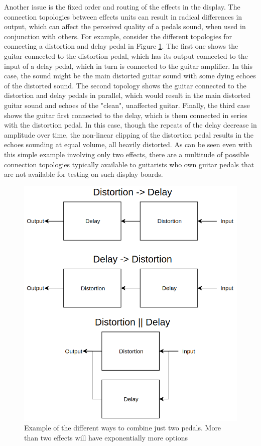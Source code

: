 \documentclass{article}
\begin{document}
	Another issue is the fixed order and routing of the effects in the display.  The connection topologies between effects units can result in radical differences in output, which can affect the perceived quality of a pedals sound, when used in conjunction with others.  For example, consider the different topologies for connecting a distortion and delay pedal in Figure \ref{fig:PedalConnectionTopologies}.  The first one shows the guitar connected to the distortion pedal, which has its output connected to the input of a delay pedal, which in turn is connected to the guitar amplifier.  In this case, the sound might be the main distorted guitar sound with some dying echoes of the distorted sound.  The second topology shows the guitar connected to the distortion and delay pedals in parallel, which would result in the main distorted guitar sound and echoes of the "clean", unaffected guitar.  Finally, the third case shows the guitar first connected to the delay, which is them connected in series with the distortion pedal.  In this case, though the repeats of the delay decrease in amplitude over time, the non-linear clipping of the distortion pedal results in the echoes sounding at equal volume, all heavily distorted.  As can be seen even with this simple example involving only two effects, there are a multitude of possible connection topologies typically available to guitarists who own guitar pedals that are not available for testing on such display boards.

	\begin{figure}
		\centering
		\includegraphics[width = 0.6 \textwidth]{RoutingConfigs.png}
		\caption{Example of the different ways to combine just two pedals.  More than two effects will have exponentially more options}
		\label{fig:PedalConnectionTopologies}
	\end{figure}
\end{document}
